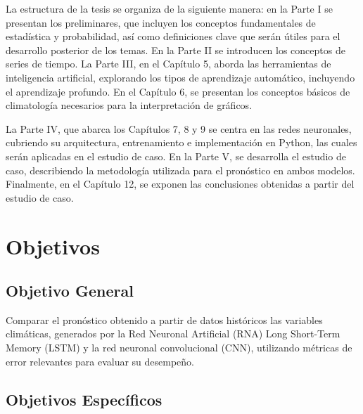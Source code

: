 \documentclass[
  us-letterpaper,
]{scrreprt}
\theoremstyle{plain}
\theoremstyle{definition}
\theoremstyle{definition}
\theoremstyle{remark}
\begin{document}
La estructura de la tesis se organiza de la siguiente manera: en la
Parte I se presentan los preliminares, que incluyen los conceptos
fundamentales de estadística y probabilidad, así como definiciones clave
que serán útiles para el desarrollo posterior de los temas. En la Parte
II se introducen los conceptos de series de tiempo. La Parte III, en el
Capítulo 5, aborda las herramientas de inteligencia artificial,
explorando los tipos de aprendizaje automático, incluyendo el
aprendizaje profundo. En el Capítulo 6, se presentan los conceptos
básicos de climatología necesarios para la interpretación de gráficos.

La Parte IV, que abarca los Capítulos 7, 8 y 9 se centra en las redes
neuronales, cubriendo su arquitectura, entrenamiento e implementación en
Python, las cuales serán aplicadas en el estudio de caso. En la Parte V,
se desarrolla el estudio de caso, describiendo la metodología utilizada
para el pronóstico en ambos modelos. Finalmente, en el Capítulo 12, se
exponen las conclusiones obtenidas a partir del estudio de caso.


\chapter*{Objetivos}\label{objetivos}


\section*{Objetivo General}\label{objetivo-general}


Comparar el pronóstico obtenido a partir de datos históricos las
variables climáticas, generados por la Red Neuronal Artificial (RNA)
Long Short-Term Memory (LSTM) y la red neuronal convolucional (CNN),
utilizando métricas de error relevantes para evaluar su desempeño.

\section*{Objetivos Específicos}\label{objetivos-especuxedficos}

\end{document}
